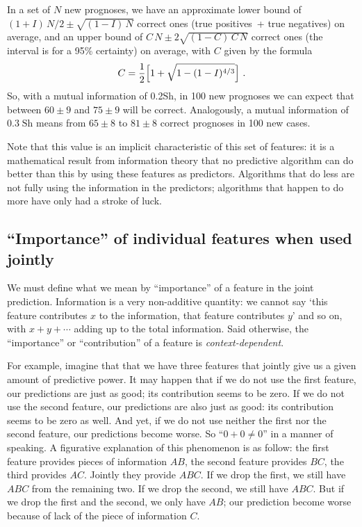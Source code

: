 \documentclass[\ifafour a4paper,12pt,\else a5paper,10pt,\fi%
onecolumn,oneside,article,%
british%
]{memoir}
\theoremstyle{remark}
\theoremstyle{innote}
\renewcommand*{\|}[1][]{\nonscript\:#1\vert\nonscript\:\mathopen{}}
\newcommand*{\bit}{\textrm{Sh}}
\begin{document}
In a set of $N$ new prognoses, we have an approximate lower bound of
$(1+I)\,N/2 \pm \sqrt{(1-I)\,N}$ correct ones (true positives~+ true
negatives) on average, and an upper bound of $C\,N \pm 2\sqrt{(1-C)\,C\,N}$
correct ones (the interval is for a 95\% certainty) on average, with $C$
given by the formula
\begin{equation}
  \label{eq:mutualinfo_est}
 C = \frac{1}{2}\Bigl[1+\sqrt{1-(1-I)^{4/3}}\Bigr] \ .
\end{equation}
So, with a mutual information of 0.2\;\bit, in 100 new prognoses we can
expect  that between $60\pm 9$ and $75\pm 9$
will be correct. Analogously, a mutual information of $0.3\;\bit$ means
from $65 \pm 8$ to $81\pm 8$ correct prognoses in 100 new cases.

Note that this value is an implicit characteristic of this set of features:
it is a mathematical result from information theory that no predictive
algorithm can do better than this by using these features as predictors.
Algorithms that do less are not fully using the information in the
predictors; algorithms that happen to do more have only had a stroke of
luck.

\subsection{\enquote{Importance} of individual features when used jointly}
\label{sec:importance_features}

We must define what we mean by \enquote{importance} of a feature in the
joint prediction. Information is a very non-additive quantity: we cannot
say \enquote*{this feature contributes $x$ to the information, that feature
  contributes $y$} and so on, with $x+y+\dotsb$ adding up to the total
information. Said otherwise, the \enquote{importance} or
\enquote{contribution} of a feature is \emph{context-dependent}.

For example, imagine that that we have three features that jointly give us
a given amount of predictive power. It may happen that if we do not use the
first feature, our predictions are just as good; its contribution seems to
be zero. If we do not use the second feature, our predictions are also just
as good: its contribution seems to be zero as well. And yet, if we do not
use neither the first nor the second feature, our predictions become worse.
So \enquote{$0+0\ne 0$} in a manner of speaking. A figurative explanation
of this phenomenon is as follow: the first feature provides pieces of
information $AB$, the second feature provides $BC$, the third provides
$AC$. Jointly they provide $ABC$. If we drop the first, we still have $ABC$
from the remaining two. If we drop the second, we still have $ABC$. But if
we drop the first and the second, we only have $AB$; our prediction become
worse because of lack of the piece of information $C$.
\end{document}
